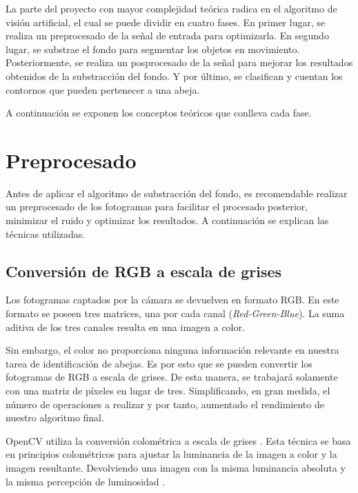 
La parte del proyecto con mayor complejidad teórica radica en el
algoritmo de visión artificial, el cual se puede dividir en cuatro
fases. En primer lugar, se realiza un preprocesado de la señal de
entrada para optimizarla. En segundo lugar, se substrae el fondo para
segmentar los objetos en movimiento. Posteriormente, se realiza un
posprocesado de la señal para mejorar los resultados obtenidos de la
substracción del fondo. Y por último, se clasifican y cuentan los
contornos que pueden pertenecer a una abeja.

A continuación se exponen los conceptos teóricos que conlleva cada fase.

\section{Preprocesado}\label{preprocesado}

Antes de aplicar el algoritmo de substracción del fondo, es recomendable
realizar un preprocesado de los fotogramas para facilitar el procesado
posterior, minimizar el ruido y optimizar los resultados. A continuación
se explican las técnicas utilizadas.

\subsection{Conversión de RGB a escala de grises}\label{conversion-de-rgb-a-escala-de-grises}

Los fotogramas captados por la cámara se devuelven en formato RGB. En
este formato se poseen tres matrices, una por cada canal
(\emph{Red-Green-Blue}). La suma aditiva de los tres canales resulta en
una imagen a color.

Sin embargo, el color no proporciona ninguna información relevante en
nuestra tarea de identificación de abejas. Es por esto que se pueden
convertir los fotogramas de RGB a escala de grises. De esta manera, se
trabajará solamente con una matriz de píxeles en lugar de tres.
Simplificando, en gran medida, el número de operaciones a realizar y por
tanto, aumentado el rendimiento de nuestro algoritmo final.

OpenCV utiliza la conversión colométrica a escala de grises
\citep{opencv:color_cvt}. Esta técnica se basa en principios
colométricos para ajustar la luminancia de la imagen a color y la imagen
resultante. Devolviendo una imagen con la misma luminancia absoluta y la
misma percepción de luminosidad \citep{wiki:grayscale}.


